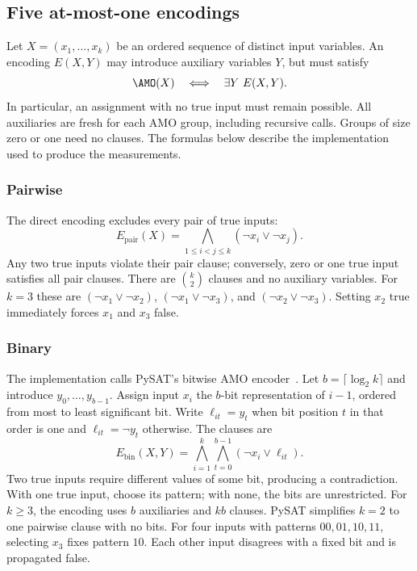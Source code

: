 \subsection{Five at-most-one encodings}
Let $X=(x_1,\ldots,x_k)$ be an ordered sequence of distinct input variables.
An encoding $E(X,Y)$ may introduce auxiliary variables $Y$, but must satisfy
\begin{equation}
\AMO(X)\quad\Longleftrightarrow\quad\exists Y\ E(X,Y).
\end{equation}
In particular, an assignment with no true input must remain possible.
All auxiliaries are fresh for each AMO group, including recursive calls.
Groups of size zero or one need no clauses. The formulas below describe
the implementation used to produce the measurements.

\subsubsection{Pairwise}
The direct encoding excludes every pair of true inputs:
\begin{equation}
E_{\mathrm{pair}}(X)=\bigwedge_{1\le i<j\le k}
(\neg x_i\vee\neg x_j).
\end{equation}
Any two true inputs violate their pair clause; conversely, zero or one
true input satisfies all pair clauses. There are $\binom{k}{2}$ clauses
and no auxiliary variables. For $k=3$ these are
$(\neg x_1\vee\neg x_2)$, $(\neg x_1\vee\neg x_3)$, and
$(\neg x_2\vee\neg x_3)$. Setting $x_2$ true immediately forces
$x_1$ and $x_3$ false.

\subsubsection{Binary}
The implementation calls PySAT's bitwise AMO encoder~\cite{pysatcard}.
Let $b=\lceil\log_2 k\rceil$ and introduce $y_0,\ldots,y_{b-1}$.
Assign input $x_i$ the $b$-bit representation of $i-1$, ordered from
most to least significant bit. Write $\ell_{it}=y_t$ when bit position
$t$ in that order is one and $\ell_{it}=\neg y_t$
otherwise. The clauses are
\begin{equation}
E_{\mathrm{bin}}(X,Y)=\bigwedge_{i=1}^{k}\bigwedge_{t=0}^{b-1}
(\neg x_i\vee\ell_{it}).
\end{equation}
Two true inputs require different values of some bit, producing a
contradiction. With one true input, choose its pattern; with none, the
bits are unrestricted. For $k\ge3$, the encoding uses $b$ auxiliaries and
$kb$ clauses. PySAT simplifies $k=2$ to one pairwise clause with no bits.
For four inputs with patterns $00,01,10,11$, selecting $x_3$ fixes pattern
$10$. Each other input disagrees with a fixed bit and is propagated false.

